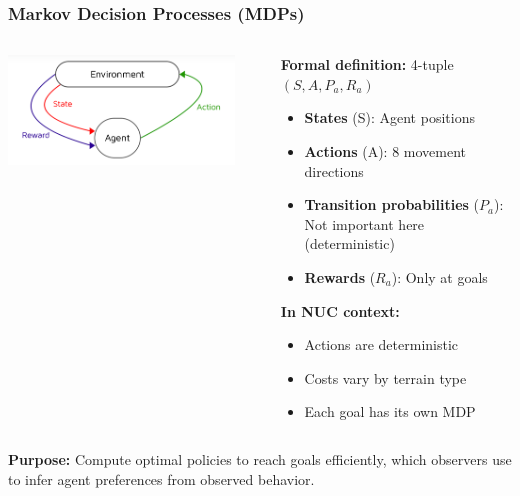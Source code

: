 \documentclass{beamer}
\begin{document}
\begin{frame}
\frametitle{Markov Decision Processes (MDPs)}
\begin{columns}
\begin{column}{0.4\textwidth}
\begin{center}
\includegraphics[width=0.9\textwidth]{mdp.png}
\end{center}
\end{column}
\begin{column}{0.6\textwidth}
\textbf{Formal definition:} 4-tuple $(S, A, P_a, R_a)$
\begin{itemize}
    \item \textbf{States} (S): Agent positions
    \item \textbf{Actions} (A): 8 movement directions  
    \item \textbf{Transition probabilities} ($P_a$): Not important here (deterministic)
    \item \textbf{Rewards} ($R_a$): Only at goals
\end{itemize}

\vspace{0.3cm}
\textbf{In NUC context:}
\begin{itemize}
    \item Actions are deterministic
    \item Costs vary by terrain type
    \item Each goal has its own MDP
\end{itemize}
\end{column}
\end{columns}

\vspace{0.3cm}
\textbf{Purpose:} Compute optimal policies to reach goals efficiently, which observers use to infer agent preferences from observed behavior.
\end{frame}
\end{document}
